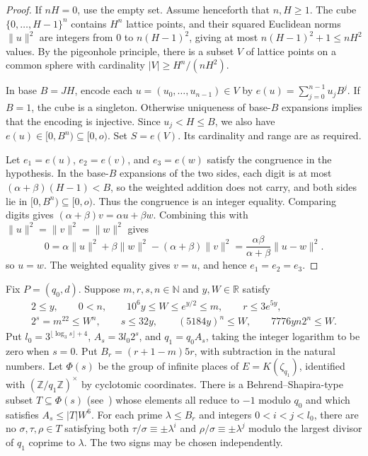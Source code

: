 \begin{proof}
If $nH=0$, use the empty set. Assume henceforth that $n,H\ge1$. The cube $\{0,\ldots,H-1\}^n$ contains $H^n$ lattice points, and their squared Euclidean norms $\|u\|^2$ are integers from $0$ to $n(H-1)^2$, giving at most $n(H-1)^2+1\le nH^2$ values.
By the pigeonhole principle, there is a subset $V$ of lattice points on a common sphere with cardinality $|V|\ge H^n/(nH^2)$.

In base $B=JH$, encode each $u=(u_0,\ldots,u_{n-1})\in V$ by
$e(u)=\sum_{j=0}^{n-1}u_j B^j$. If $B=1$, the cube is a singleton. Otherwise uniqueness of base-$B$ expansions implies that the encoding is injective.
Since $u_j<H\le B$, we also have $e(u)\in[0,B^n)\subseteq[0,o)$. Set $S=e(V)$. Its cardinality and range are as required.

Let $e_1=e(u)$, $e_2=e(v)$, and $e_3=e(w)$ satisfy the congruence in the hypothesis. In the base-$B$ expansions of the two sides, each digit is at most
$(\alpha+\beta)(H-1)<B$, so the weighted addition does not carry, and both sides lie in $[0,B^n)\subseteq[0,o)$.
Thus the congruence is an integer equality. Comparing digits gives $(\alpha+\beta)v=\alpha u+\beta w$.
Combining this with $\|u\|^2=\|v\|^2=\|w\|^2$ gives
\[
 0
 =\alpha\|u\|^2+\beta\|w\|^2-(\alpha+\beta)\|v\|^2
 =\frac{\alpha\beta}{\alpha+\beta}\|u-w\|^2 .
\]
so $u=w$. The weighted equality gives $v=u$, and hence $e_1=e_2=e_3$.
\end{proof}

\begin{lemma}
\label{lem:sparse-places-ranks}
\emitthmsource
Fix $P=(q_0,d)$. Suppose $m,r,s,n\in\mathbb N$ and $y,W\in\mathbb R$ satisfy
\[
\begin{gathered}
 2\le y,\qquad 0<n,\qquad 10^6 y\le W\le e^{y/2}\le m,\qquad
 r\le 3 e^{5y},\\
 2^s=m^{22}\le W^n,\qquad s\le32y,\qquad
 (5184y)^n\le W,\qquad 7776yn2^n\le W .
\end{gathered}
\]
Put $l_0=3^{\lfloor\log_3 s\rfloor+4}$, $A_s=3l_0 2^s$, and $q_1=q_0A_s$, taking the integer logarithm to be zero when $s=0$. Put $B_r=(r+1-m)5r$, with subtraction in the natural numbers.
Let $\Phi(s)$ be the group of infinite places of $E=K(\zeta_{q_1})$, identified with $(\mathbb Z/q_1\mathbb Z)^\times$ by cyclotomic coordinates. There is a Behrend--Shapira-type subset $T\subseteq\Phi(s)$ (see~\cite{Behrend1946,Shapira2006}) whose elements all reduce to $-1$ modulo $q_0$ and which satisfies $A_s\le|T|W^6$. For each prime $\lambda\le B_r$ and integers $0<i<j<l_0$, there are no $\sigma,\tau,\rho\in T$ satisfying both $\tau/\sigma\equiv\pm\lambda^i$ and $\rho/\sigma\equiv\pm\lambda^j$ modulo the largest divisor of $q_1$ coprime to $\lambda$. The two signs may be chosen independently.
\end{lemma}

